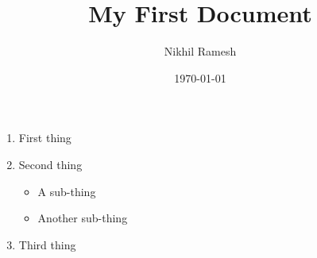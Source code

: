\documentclass[a4paper,12pt]{article}
\begin{document}
\title{My First Document}
\author{Nikhil Ramesh}
\date{\today}
\maketitle

\begin{enumerate}

\item First thing

\item Second thing

\begin{itemize}

\item A sub-thing

\item Another sub-thing

\end{itemize}

\item Third thing

\end{enumerate}
\end{document}
